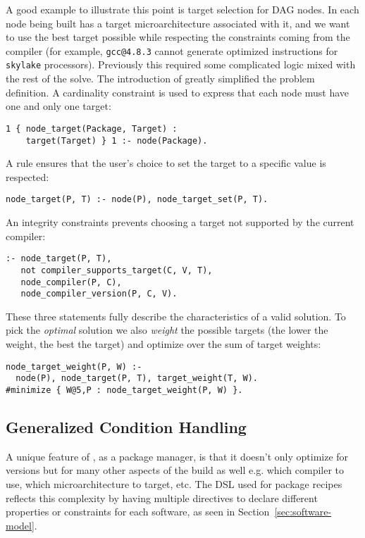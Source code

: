A good example to illustrate this point is target selection for DAG nodes. In \spack{}
each node being built has a target microarchitecture associated with it, and we want to
use the best target possible while respecting the constraints coming from the compiler
(for example, {\tt gcc@4.8.3} cannot generate optimized instructions for {\tt skylake}
processors). Previously this required some complicated logic mixed with the rest of the
solve. The introduction of \clingo{} greatly simplified the problem definition. A
cardinality constraint is used to express that each node must have one and only one
target:
%
\begin{verbatim}
1 { node_target(Package, Target) :
    target(Target) } 1 :- node(Package).
\end{verbatim}
%
A rule ensures that the user's choice to set the target to a specific value is respected:
%
\begin{verbatim}
node_target(P, T) :- node(P), node_target_set(P, T).
\end{verbatim}
%
An integrity constraints prevents choosing a target not supported by the current compiler:
%
\begin{verbatim}
:- node_target(P, T),
   not compiler_supports_target(C, V, T),
   node_compiler(P, C),
   node_compiler_version(P, C, V).
\end{verbatim}
%
These three statements fully describe the characteristics of a valid solution. To pick
the \emph{optimal} solution we also \emph{weight} the possible targets (the lower the
weight, the best the target) and optimize over the sum of target weights:
%
\begin{verbatim}
node_target_weight(P, W) :-
  node(P), node_target(P, T), target_weight(T, W).
#minimize { W@5,P : node_target_weight(P, W) }.
\end{verbatim}

\subsection{Generalized Condition Handling}
\label{subsec:generalizedcond}
A unique feature of \spack, as a package manager, is that it doesn't only optimize for
versions but for many other aspects of the build as well e.g. which compiler to use,
which microarchitecture to target, etc. The DSL used for package recipes reflects this
complexity by having multiple directives to declare different properties or constraints
for each software, as seen in Section~\ref{sec:software-model}.

